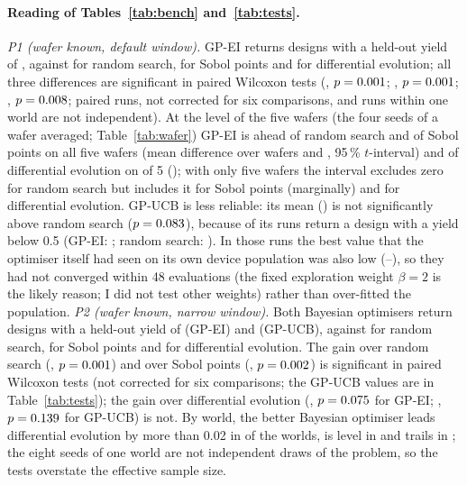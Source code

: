 \paragraph{Reading of Tables~\ref{tab:bench} and~\ref{tab:tests}.}
\emph{P1 (wafer known, default window).} GP-EI returns designs with a held-out yield of \benchOneBoEi{}, against \benchOneRandom{} for random search, \benchOneSobol{} for Sobol points and \benchOneDe{} for differential evolution; all three differences are significant in paired Wilcoxon tests (\diffOneBoEiRandom{}, $p=0.001$; \diffOneBoEiSobol{}, $p=0.001$; \diffOneBoEiDe{}, $p=0.008$; \nRunsOne{} paired runs, not corrected for six comparisons, and runs within one world are not independent).
At the level of the five wafers (the four seeds of a wafer averaged; Table~\ref{tab:wafer}) GP-EI is ahead of random search and of Sobol points on all five wafers (mean difference over wafers \waferOneBoEiRandom{} and \waferOneBoEiSobol{}, 95\,\% $t$-interval) and of differential evolution on \waferAheadOneBoEiDe{} of 5 (\waferOneBoEiDe{}); with only five wafers the interval excludes zero for random search but includes it for Sobol points (marginally) and for differential evolution.
GP-UCB is less reliable: its mean (\benchOneBoUcb{}) is not significantly above random search ($p=0.083$), because \lowRunsOneBoUcb{} of its \nRunsOnePerMethod{} runs return a design with a yield below 0.5 (GP-EI: \lowRunsOneBoEi{}; random search: \lowRunsOneRandom{}).
In those runs the best value that the optimiser itself had seen on its own device population was also low (\ucbLowBestMin--\ucbLowBestMax), so they had not converged within 48 evaluations (the fixed exploration weight $\beta=2$ is the likely reason; I did not test other weights) rather than over-fitted the population.
\emph{P2 (wafer known, narrow window).} Both Bayesian optimisers return designs with a held-out yield of \benchTwoBoEi{} (GP-EI) and \benchTwoBoUcb{} (GP-UCB), against \benchTwoRandom{} for random search, \benchTwoSobol{} for Sobol points and \benchTwoDe{} for differential evolution.
The gain over random search (\diffTwoBoEiRandom{}, $p=0.001$) and over Sobol points (\diffTwoBoEiSobol{}, $p=0.002$) is significant in paired Wilcoxon tests (not corrected for six comparisons; the GP-UCB values are in Table~\ref{tab:tests});
the gain over differential evolution (\diffTwoBoEiDe{}, $p=0.075$ for GP-EI; \diffTwoBoUcbDe{}, $p=0.139$ for GP-UCB) is not.
By world, the better Bayesian optimiser leads differential evolution by more than 0.02 in \worldsBoAheadDeTwo{} of the \nWorldsTwo{} worlds, is level in \worldsTieBoDeTwo{} and trails in \worldsDeAheadBoTwo{}; the eight seeds of one world are not independent draws of the problem, so the tests overstate the effective sample size.
